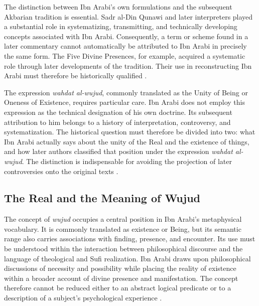 \label{para:VS.B01.P01.C08.S16.SS02.P002}

The distinction between Ibn Arabi's own formulations and
the subsequent Akbarian tradition is essential. Sadr al-Din
Qunawi and later interpreters played a substantial role in
systematizing, transmitting, and technically developing
concepts associated with Ibn Arabi. Consequently, a term
or scheme found in a later commentary cannot automatically
be attributed to Ibn Arabi in precisely the same form.
The Five Divine Presences, for example, acquired a
systematic role through later developments of the tradition.
Their use in reconstructing Ibn Arabi must therefore be
historically qualified \citep{ChittickFiveDivinePresences1982}.

\label{para:VS.B01.P01.C08.S16.SS02.P003}

The expression \textit{wahdat al-wujud}, commonly translated
as the Unity of Being or Oneness of Existence, requires
particular care. Ibn Arabi does not employ this expression
as the technical designation of his own doctrine. Its
subsequent attribution to him belongs to a history of
interpretation, controversy, and systematization. The
historical question must therefore be divided into two:
what Ibn Arabi actually says about the unity of the Real
and the existence of things, and how later authors classified
that position under the expression \textit{wahdat al-wujud}.
The distinction is indispensable for avoiding the projection
of later controversies onto the original texts
\citep{ChittickIbnArabiSEP2025,ChittickWahdatAlWujud1994}.



\subsection{The Real and the Meaning of Wujud}
\label{subsec:ch08_s16_ss03}

\label{para:VS.B01.P01.C08.S16.SS03.P001}

The concept of \textit{wujud} occupies a central position
in Ibn Arabi's metaphysical vocabulary. It is commonly
translated as existence or Being, but its semantic range
also carries associations with finding, presence, and
encounter. Its use must be understood within the interaction
between philosophical discourse and the language of
theological and Sufi realization. Ibn Arabi draws upon
philosophical discussions of necessity and possibility
while placing the reality of existence within a broader
account of divine presence and manifestation. The concept
therefore cannot be reduced either to an abstract logical
predicate or to a description of a subject's psychological
experience \citep{ChittickSufiPathKnowledge1989}.

